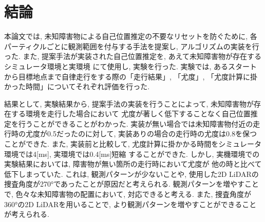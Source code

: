 \chapter{結論}

本論文では, 未知障害物による自己位置推定の不要なリセットを防ぐために, 
各パーティクルごとに観測範囲を付与する手法を提案し, アルゴリズムの実装を行った. 
また, 提案手法が実装された自己位置推定を, あえて未知障害物が存在するシミュレータ環境と実環境
にて使用し, 実験を行った. 
実験では, あるスタートから目標地点まで自律走行をする際の「走行結果」, 「尤度」, 
「尤度計算に掛かった時間」についてそれぞれ評価を行った. 

結果として, 実験結果から, 提案手法の実装を行うことによって, 未知障害物が存在する環境を走行した場合において
尤度が著しく低下することなく自己位置推定を行うことができることがわかった. 
実装が無い場合では未知障害物付近の走行時の尤度が0.5だったのに対して, 
実装ありの場合の走行時の尤度は0.8を保つことができた. 
また, 実装前と比較して, 尤度計算に掛かかる時間をシミュレータ環境では4[ms], 実環境では0.4[ms]短縮
することができた. 
しかし, 実機環境での実験結果においては, 障害物が無い箇所の走行時において尤度が
他の時と比べて低下しまっていた. 
これは, 観測パターンが少ないことや, 使用した2D LiDARの捜査角度が270°であったことが原因だと考えられる. 
観測パターンを増やすことで, 色々な未知障害物の配置において, 対応できると考える. 
また, 捜査角度が360°の2D LiDARを用いることで, より観測パターンを増やすことができることが考えられる. 
